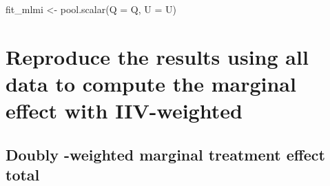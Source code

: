 \documentclass[
  letterpaper,
  DIV=11,
  numbers=noendperiod]{scrreprt}
\newenvironment{Shaded}{\begin{snugshade}}{\end{snugshade}}
\newcommand{\AttributeTok}[1]{\textcolor[rgb]{0.40,0.45,0.13}{#1}}
\newcommand{\FunctionTok}[1]{\textcolor[rgb]{0.28,0.35,0.67}{#1}}
\newcommand{\NormalTok}[1]{\textcolor[rgb]{0.00,0.23,0.31}{#1}}
\newcommand{\OtherTok}[1]{\textcolor[rgb]{0.00,0.23,0.31}{#1}}
\begin{document}
\begin{Shaded}
\begin{Highlighting}[]
\NormalTok{fit\_mlmi }\OtherTok{\textless{}{-}} \FunctionTok{pool.scalar}\NormalTok{(}\AttributeTok{Q =}\NormalTok{ Q, }\AttributeTok{U =}\NormalTok{ U)}
\end{Highlighting}
\end{Shaded}

\hypertarget{reproduce-the-results-using-all-data-to-compute-the-marginal-effect-with-iiv-weighted}{%
\section{Reproduce the results using all data to compute the marginal
effect with
IIV-weighted}\label{reproduce-the-results-using-all-data-to-compute-the-marginal-effect-with-iiv-weighted}}

\hypertarget{doubly--weighted-marginal-treatment-effect-total}{%
\subsection{Doubly -weighted marginal treatment effect
total}\label{doubly--weighted-marginal-treatment-effect-total}}
\end{document}
